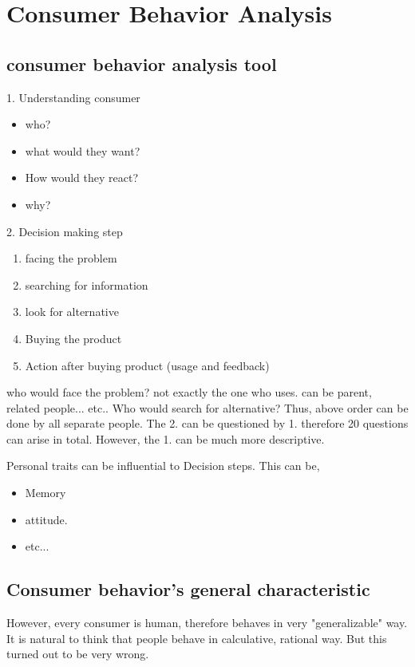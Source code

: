 \documentclass[12pt]{article}
\begin{document}
\section{Consumer Behavior Analysis}
\subsection{consumer behavior analysis tool}
1. Understanding consumer
\begin{itemize}
	\item who?
	\item what would they want?
	\item How would they react?
	\item why?
\end{itemize}

2. Decision making step
\begin{enumerate}
	\item facing the problem
	\item searching for information
	\item look for alternative
	\item Buying the product
	\item Action after buying product (usage and feedback)

\end{enumerate}

who would face the problem? not exactly the one who uses. can be parent, related people... etc..
Who would search for alternative? Thus, above order can be done by all separate people.
The 2. can be questioned by 1. therefore 20 questions can arise in total. However, the 1. can be much more descriptive.

Personal traits can be influential to Decision steps. This can be,
\begin{itemize}
	\item Memory
	\item attitude.
	\item etc...
\end{itemize}

\subsection{Consumer behavior's general characteristic}

However, every consumer is human, therefore behaves in very "generalizable" way. It is natural to think that people behave in calculative, rational way. But this turned out to be very wrong.
\end{document}
